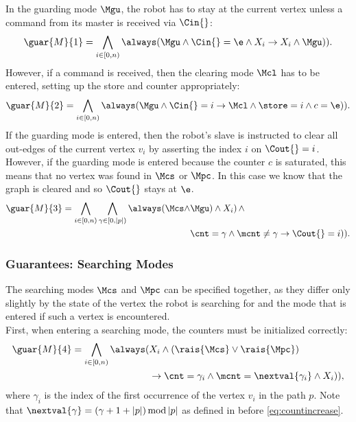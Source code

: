 In the guarding mode $\Mgu$, the robot has to stay at the current vertex unless a command from its master is received via $\Cin{}$:
\begin{equation*}
	\guar{M}{1} = \bigwedge_{i \in [0, n)}\always(\Mgu \wedge \Cin{}=\e \wedge X_i \rightarrow \next(X_i \wedge \Mgu)).
\end{equation*}
However, if a command is received, then the clearing mode $\Mcl$ has to be entered, setting up the store and counter appropriately:
\begin{equation*}
	\guar{M}{2} = \bigwedge_{i \in [0, n)}\always(\Mgu \wedge \Cin{}=i \rightarrow \next(\Mcl \wedge \store=i \wedge c=\e)).
\end{equation*}
If the guarding mode is entered, then the robot's slave is instructed to clear all out-edges of the current vertex $v_i$ by asserting the index $i$ on $\Cout{} = i$. However, if the guarding mode is entered because the counter $c$ is saturated, this means that no vertex was found in $\Mcs$ or $\Mpc$. In this case we know that the graph is cleared and so $\Cout{}$ stays at $\e$.\\
\begin{align*}
	\guar{M}{3} = \bigwedge_{i \in [0, n)}\bigwedge_{\gamma \in [0, |p|)}\always(\Mcs \wedge &\next(\Mgu) \wedge \next(X_i)\,\wedge\\
 &\cnt=\gamma \wedge \mcnt\neq\gamma \rightarrow \next(\Cout{}=i)).
\end{align*}


\subsubsection{Guarantees: Searching Modes}

The searching modes $\Mcs$ and $\Mpc$ can be specified together, as they differ only slightly by the state of the vertex the robot is searching for and the mode that is entered if such a vertex is encountered.\\

First, when entering a searching mode, the counters must be initialized correctly:
\begin{align*}
	\guar{M}{4} = \bigwedge_{i \in [0, n)}\always(&X_i \wedge (\rais{\Mcs} \vee \rais{\Mpc}) \\ &\rightarrow \next(\cnt=\gamma_i \wedge \mcnt=\nextval{\gamma_i} \wedge X_i)),
\end{align*}
where $\gamma_i$ is the index of the first occurrence of the vertex $v_i$ in the path $p$. Note that $\nextval{\gamma} = (\gamma + 1 + |p|) \mathop\mathrm{mod} |p|$ as defined in  before \eqref{eq:countincrease}.\\


